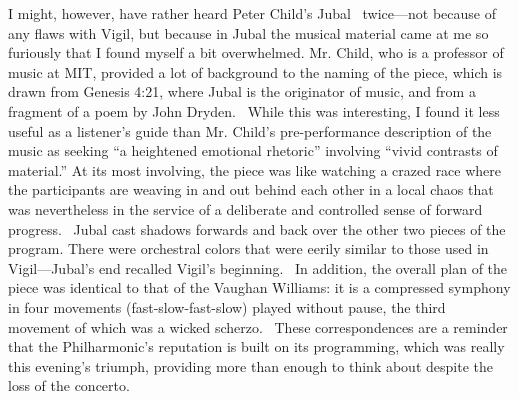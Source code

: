 I might, however, have rather heard Peter Child’s Jubal  twice—not because of any flaws with Vigil, but because in Jubal the musical material came at me so furiously that I found myself a bit overwhelmed. Mr. Child, who is a professor of music at MIT, provided a lot of background to the naming of the piece, which is drawn from Genesis 4:21, where Jubal is the originator of music, and from a fragment of a poem by John Dryden.  While this was interesting, I found it less useful as a listener’s guide than Mr. Child’s pre-performance description of the music as seeking “a heightened emotional rhetoric” involving “vivid contrasts of material.” At its most involving, the piece was like watching a crazed race where the participants are weaving in and out behind each other in a local chaos that was nevertheless in the service of a deliberate and controlled sense of forward progress.  Jubal cast shadows forwards and back over the other two pieces of the program. There were orchestral colors that were eerily similar to those used in Vigil—Jubal’s end recalled Vigil’s beginning.  In addition, the overall plan of the piece was identical to that of the Vaughan Williams: it is a compressed symphony in four movements (fast-slow-fast-slow) played without pause, the third movement of which was a wicked scherzo.  These correspondences are a reminder that the Philharmonic’s reputation is built on its programming, which was really this evening’s triumph, providing more than enough to think about despite the loss of the concerto.


